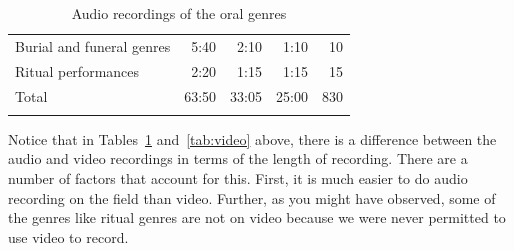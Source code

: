 \documentclass[output=paper,colorlinks,citecolor=brown]{langscibook}
\begin{document}
\begin{table}
{\begin{tabularx}{\textwidth}{Xrrrr}
   		Burial and funeral genres         & 5:40                  & 2:10                         & 1:10                      & 10                    \\
   		Ritual performances               & 2:20                  & 1:15                         & 1:15                      & 15                    \\ \midrule
   		Total                   & 63:50        & 33:05              & 25:00           & 830  \\
   		\lspbottomrule
   	\end{tabularx}
    \caption{Audio recordings of the oral genres\label{tab:audio}}}
\end{table}

\begin{table}
\end{table}

Notice that in Tables~\ref{tab:audio} and~\ref{tab:video} above, there is a difference between the audio and video recordings in terms of the length of recording. There are a number of factors that account for this. First, it is much easier to do audio recording on the field than video. Further, as you might have observed, some of the genres like ritual genres are not on video because we were never permitted to use video to record. 
\end{document}

